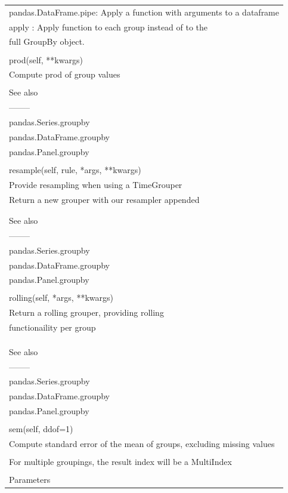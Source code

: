 \documentclass[11pt]{article}
\begin{document}
\begin{enumerate}
\begin{enumerate}
\begin{enumerate}
\begin{center}
\begin{tabular}{l}
pandas.DataFrame.pipe: Apply a function with arguments to a dataframe\\
apply : Apply function to each group instead of to the\\
full GroupBy object.\\
\\
prod(self, **kwargs)\\
Compute prod of group values\\
\\
See also\\
--------\\
pandas.Series.groupby\\
pandas.DataFrame.groupby\\
pandas.Panel.groupby\\
\\
resample(self, rule, *args, **kwargs)\\
Provide resampling when using a TimeGrouper\\
Return a new grouper with our resampler appended\\
\\
\\
See also\\
--------\\
pandas.Series.groupby\\
pandas.DataFrame.groupby\\
pandas.Panel.groupby\\
\\
rolling(self, *args, **kwargs)\\
Return a rolling grouper, providing rolling\\
functionaility per group\\
\\
\\
\\
See also\\
--------\\
pandas.Series.groupby\\
pandas.DataFrame.groupby\\
pandas.Panel.groupby\\
\\
sem(self, ddof=1)\\
Compute standard error of the mean of groups, excluding missing values\\
\\
For multiple groupings, the result index will be a MultiIndex\\
\\
Parameters\\

\end{tabular}
\end{center}
\end{enumerate}
\end{enumerate}
\end{enumerate}
\end{document}
